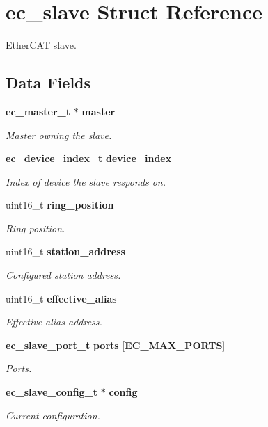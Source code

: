 \section{ec\-\_\-slave Struct Reference}
\label{structec__slave}


Ether\-C\-A\-T slave.  


\subsection*{Data Fields}
\begin{DoxyCompactItemize}
\item 
{\bf ec\-\_\-master\-\_\-t} $\ast$ {\bf master}
\begin{DoxyCompactList}\small\item\em Master owning the slave. \end{DoxyCompactList}\item 
{\bf ec\-\_\-device\-\_\-index\-\_\-t} {\bf device\-\_\-index}
\begin{DoxyCompactList}\small\item\em Index of device the slave responds on. \end{DoxyCompactList}\item 
uint16\-\_\-t {\bf ring\-\_\-position}
\begin{DoxyCompactList}\small\item\em Ring position. \end{DoxyCompactList}\item 
uint16\-\_\-t {\bf station\-\_\-address}
\begin{DoxyCompactList}\small\item\em Configured station address. \end{DoxyCompactList}\item 
uint16\-\_\-t {\bf effective\-\_\-alias}
\begin{DoxyCompactList}\small\item\em Effective alias address. \end{DoxyCompactList}\item 
{\bf ec\-\_\-slave\-\_\-port\-\_\-t} {\bf ports} [{\bf E\-C\-\_\-\-M\-A\-X\-\_\-\-P\-O\-R\-T\-S}]
\begin{DoxyCompactList}\small\item\em Ports. \end{DoxyCompactList}\item 
{\bf ec\-\_\-slave\-\_\-config\-\_\-t} $\ast$ {\bf config}
\begin{DoxyCompactList}\small\item\em Current configuration. \end{DoxyCompactList}\item 

\end{DoxyCompactItemize}

